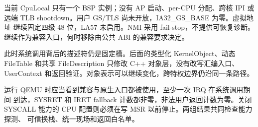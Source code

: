 当前 CpuLocal 只有一个 BSP 实例；没有 AP 启动、per-CPU 分配、跨核 IPI 或
远端 TLB shootdown。用户 GS/TLS 尚未开放，IA32\_GS\_BASE 为零。虚拟地址
继续固定四级 48 位，LA57 未启用。NMI 采用 fail-stop，不提供可恢复诊断。
 继续作为兼容入口，何时移除由公共 ABI 的兼容要求决定。

此时系统调用背后的描述符仍是固定槽。后面的类型化 KernelObject、动态
FileTable 和共享 FileDescription 只修改 C++ 对象层，没有改写汇编入口、
UserContext 和返回验证。对象表示可以继续变化，跨特权边界仍沿同一条路径。

运行 QEMU 时应当看到兼容与原生入口都被使用，至少一次 IRQ 在系统调用期间
到达，SYSRET 和 IRET fallback 计数都非零，非法用户返回计数为零。关闭
SYSCALL 能力的 CPU 配置则必须在写 MSR 以前停止。两组结果共同检查能力探测、
可信换栈、统一现场和返回白名单。
